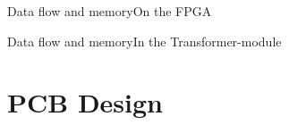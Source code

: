 \documentclass[10pt]{beamer}
\begin{document}
\begin{frame}{Data flow and memory}{On the FPGA}
\end{frame}

\begin{frame}{Data flow and memory}{In the Transformer-module}
\end{frame}


\section{PCB Design}
\end{document}
